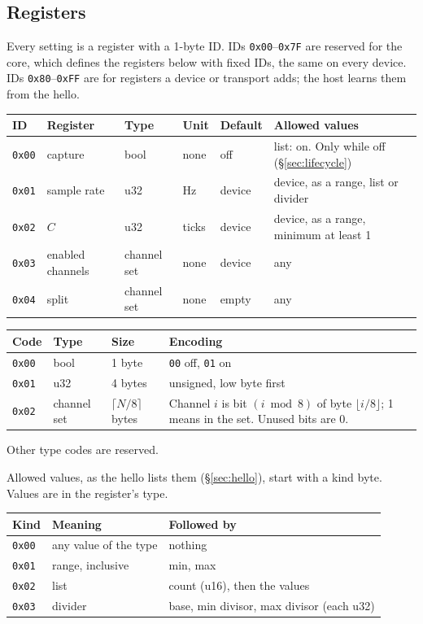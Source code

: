 \documentclass[11pt,a4paper]{article}
\newcommand{\sref}[1]{\S\ref{#1}}
\newcommand{\hex}[1]{\texttt{#1}}
\begin{document}
\subsection{Registers}\label{sec:registers}

Every setting is a register with a 1-byte ID. IDs \hex{0x00}--\hex{0x7F} are
reserved for the core, which defines the registers below with fixed IDs, the same on
every device. IDs \hex{0x80}--\hex{0xFF} are for registers a device or transport adds;
the host learns them from the hello.

\begin{tabularx}{\linewidth}{@{}l l l l l L@{}}
\toprule
\textbf{ID} & \textbf{Register} & \textbf{Type} & \textbf{Unit} & \textbf{Default} & \textbf{Allowed values} \\
\midrule
\hex{0x00} & capture & bool & none & off & list: on. Only while off (\sref{sec:lifecycle}) \\
\hex{0x01} & sample rate & u32 & Hz & device & device, as a range, list or divider \\
\hex{0x02} & $C$ & u32 & ticks & device & device, as a range, minimum at least 1 \\
\hex{0x03} & enabled channels & channel set & none & device & any \\
\hex{0x04} & split & channel set & none & empty & any \\
\bottomrule
\end{tabularx}

\medskip

\begin{tabularx}{\linewidth}{@{}l l l L@{}}
\toprule
\textbf{Code} & \textbf{Type} & \textbf{Size} & \textbf{Encoding} \\
\midrule
\hex{0x00} & bool & 1 byte & \hex{00} off, \hex{01} on \\
\hex{0x01} & u32 & 4 bytes & unsigned, low byte first \\
\hex{0x02} & channel set & $\lceil N/8 \rceil$ bytes & Channel $i$ is bit $(i \bmod 8)$ of byte $\lfloor i/8 \rfloor$; 1 means in the set. Unused bits are 0. \\
\bottomrule
\end{tabularx}

Other type codes are reserved.

Allowed values, as the hello lists them (\sref{sec:hello}), start with a kind byte.
Values are in the register's type.

\begin{tabularx}{\linewidth}{@{}l l L@{}}
\toprule
\textbf{Kind} & \textbf{Meaning} & \textbf{Followed by} \\
\midrule
\hex{0x00} & any value of the type & nothing \\
\hex{0x01} & range, inclusive & min, max \\
\hex{0x02} & list & count (u16), then the values \\
\hex{0x03} & divider & base, min divisor, max divisor (each u32) \\
\bottomrule
\end{tabularx}
\end{document}
